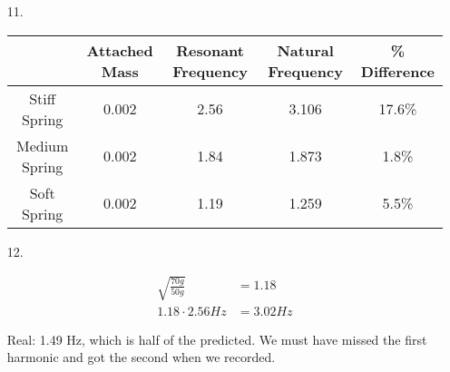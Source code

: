 \documentclass[10pt, letterpaper]{article}
\begin{document}
\begin{itemize}
        \item[11.]\mbox{}
        
        \begin{center}
            \begin{tabular}{|c|c|c|c|c|}
                \hline
                & Attached Mass & Resonant Frequency & Natural Frequency & \% Difference    \\
                \hline
                Stiff Spring & 0.002 & 2.56 & 3.106 & 17.6\% \\
                \hline
                Medium Spring & 0.002 & 1.84 & 1.873 & 1.8\% \\
                \hline
                Soft Spring & 0.002 & 1.19 & 1.259 & 5.5\% \\
                \hline
            \end{tabular}
        \end{center}

        \item [12.]
        
        \begin{align*}
            \sqrt{\frac{70g}{50g}}    & = 1.18    \\
            1.18 \cdot 2.56 Hz       & = 3.02 Hz
        \end{align*}

        Real: 1.49 Hz, which is half of the predicted. We must have missed the first harmonic and got the second when we recorded.

    \end{itemize}
    
\end{document}
